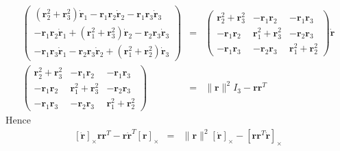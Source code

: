\documentclass {article}
\newcommand\rot{\mathbf{r}}
\newcommand\rcross{[\rot]_{\times}}
\newcommand\rdotcross{\left[\dot{\rot}\right]_{\times}}
\newcommand\normr{\|\rot\|}
\begin{document}
\begin{eqnarray*}
\left(\begin{array}{c}
(\rot_2^2+\rot_3^2)\dot{\rot}_1-\rot_1\rot_2\dot{\rot}_2-\rot_1\rot_3\dot{\rot}_3\\
-\rot_1\rot_2\dot{\rot}_1+(\rot_1^2+\rot_3^2)\dot{\rot}_2-\rot_2\rot_3\dot{\rot}_3\\
-\rot_1\rot_3\dot{\rot}_1-\rot_2\rot_3\dot{\rot}_2+(\rot_1^2+\rot_2^2)\dot{\rot}_3\end{array}\right) &=&
\left(\begin{array}{ccc}
\rot_2^2+\rot_3^2&-\rot_1\rot_2&-\rot_1\rot_3\\
-\rot_1\rot_2&\rot_1^2+\rot_3^2&-\rot_2\rot_3\\
-\rot_1\rot_3&-\rot_2\rot_3&\rot_1^2+\rot_2^2\end{array}\right) \dot{\rot}\\
\left(\begin{array}{ccc}
\rot_2^2+\rot_3^2&-\rot_1\rot_2&-\rot_1\rot_3\\
-\rot_1\rot_2&\rot_1^2+\rot_3^2&-\rot_2\rot_3\\
-\rot_1\rot_3&-\rot_2\rot_3&\rot_1^2+\rot_2^2\end{array}\right) &=& \normr^2 I_3 - \rot\rot^T
\end{eqnarray*}
Hence
\begin{eqnarray}\label{eq:ouf}
\rdotcross\rot\rot^T-\rot\dot{\rot}^T\rcross&=&
\normr^2\rdotcross - \left[\rot\rot^T\dot{\rot}\right]_{\times}
\end{eqnarray}
\end{document}
